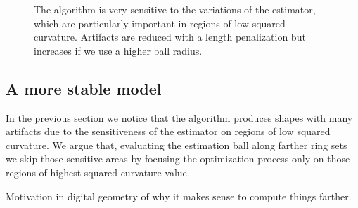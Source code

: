 \documentclass[runningheads]{llncs}
\newcommand{\jaco}[1]{{\textcolor{green!50!black}{#1}}}
\begin{document}
\begin{figure}[!ht]
\begin{minipage}[b]{0.33\textwidth}
{	}%
\end{minipage}%
\begin{minipage}[b]{0.33\textwidth}
\end{minipage}%
\caption{The algorithm is very sensitive to the variations of the estimator, which are particularly important in regions of low squared curvature. Artifacts are reduced with a length penalization but increases if we use a higher ball radius. }
\label{fig:m1-square-flow}
\end{figure}


\subsection{A more stable model}

In the previous section we notice that the algorithm produces shapes with many artifacts due to the sensitiveness of the estimator on regions of low squared curvature. We argue that, evaluating the estimation ball along farther ring sets we skip those sensitive areas by focusing the optimization process only on those regions of highest squared curvature value. 

\jaco{Motivation in digital geometry of why it makes sense to compute things farther.}
\end{document}
